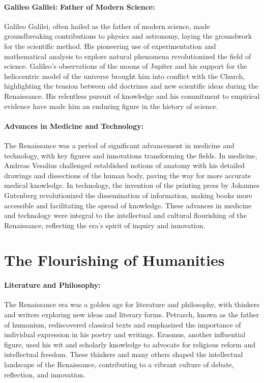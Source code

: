\documentclass{book}
\begin{document}
\paragraph{Galileo Galilei: Father of Modern Science:}
Galileo Galilei, often hailed as the father of modern science, made groundbreaking contributions to physics and astronomy, laying the groundwork for the scientific method. His pioneering use of experimentation and mathematical analysis to explore natural phenomena revolutionized the field of science. Galileo’s observations of the moons of Jupiter and his support for the heliocentric model of the universe brought him into conflict with the Church, highlighting the tension between old doctrines and new scientific ideas during the Renaissance. His relentless pursuit of knowledge and his commitment to empirical evidence have made him an enduring figure in the history of science.

\paragraph{Advances in Medicine and Technology:}
The Renaissance was a period of significant advancement in medicine and technology, with key figures and innovations transforming the fields. In medicine, Andreas Vesalius challenged established notions of anatomy with his detailed drawings and dissections of the human body, paving the way for more accurate medical knowledge. In technology, the invention of the printing press by Johannes Gutenberg revolutionized the dissemination of information, making books more accessible and facilitating the spread of knowledge. These advances in medicine and technology were integral to the intellectual and cultural flourishing of the Renaissance, reflecting the era's spirit of inquiry and innovation.

\section*{The Flourishing of Humanities}

\paragraph{Literature and Philosophy:}
The Renaissance era was a golden age for literature and philosophy, with thinkers and writers exploring new ideas and literary forms. Petrarch, known as the father of humanism, rediscovered classical texts and emphasized the importance of individual expression in his poetry and writings. Erasmus, another influential figure, used his wit and scholarly knowledge to advocate for religious reform and intellectual freedom. These thinkers and many others shaped the intellectual landscape of the Renaissance, contributing to a vibrant culture of debate, reflection, and innovation.
\end{document}

